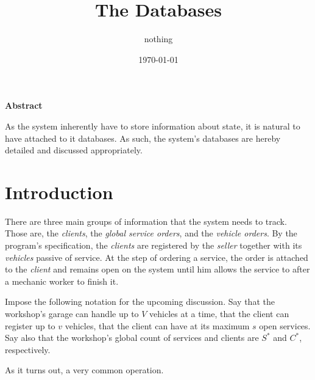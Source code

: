 \documentclass[10pt]{article}
\author{nothing}
\date{\today}
\title{The Databases}
\theoremstyle{definition}
\begin{document}
\maketitle

\begin{centering}
\textbf{Abstract} \small
\vspace{.2cm}

As the system inherently have to store information about state, it is natural to have attached to it databases. As such, the system's databases are hereby detailed and discussed appropriately.

\vspace{.5cm}
\end{centering}


\section{Introduction}

There are three main groups of information that the system needs to track. Those are, the \textit{clients}, the \textit{global service orders}, and the \textit{vehicle orders}. By the program's specification, the \textit{clients} are registered by the \textit{seller} together with its \textit{vehicles} passive of service. At the step of ordering a service, the order is attached to the \textit{client} and remains open on the system until him allows the service to after a mechanic worker to finish it.

Impose the following notation for the upcoming discussion. Say that the workshop's garage can handle up to \(V\) vehicles at a time, that the client can register up to \(v\) vehicles, that the client can have at its maximum \(s\) open services. Say also that the workshop's global count of services and clients are \(S^*\) and \(C^*\), respectively.

As it turns out, a very common operation.
\end{document}
